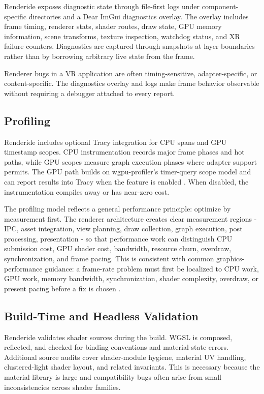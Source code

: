\documentclass[acmtog,screen,nonacm]{acmart}
\begin{document}
Renderide exposes diagnostic state through file-first logs under component-specific directories and a Dear ImGui diagnostics overlay. The overlay includes frame timing, renderer stats, shader routes, draw state, GPU memory information, scene transforms, texture inspection, watchdog status, and XR failure counters. Diagnostics are captured through snapshots at layer boundaries rather than by borrowing arbitrary live state from the frame.

Renderer bugs in a VR application are often timing-sensitive, adapter-specific, or content-specific. The diagnostics overlay and logs make frame behavior observable without requiring a debugger attached to every report.

\subsection{Profiling}

Renderide includes optional Tracy integration for CPU spans and GPU timestamp scopes. CPU instrumentation records major frame phases and hot paths, while GPU scopes measure graph execution phases where adapter support permits. The GPU path builds on wgpu-profiler's timer-query scope model and can report results into Tracy when the feature is enabled \citep{tracyProfiler,wgpuProfiler}. When disabled, the instrumentation compiles away or has near-zero cost.

The profiling model reflects a general performance principle: optimize by measurement first. The renderer architecture creates clear measurement regions - IPC, asset integration, view planning, draw collection, graph execution, post processing, presentation - so that performance work can distinguish CPU submission cost, GPU shader cost, bandwidth, resource churn, overdraw, synchronization, and frame pacing. This is consistent with common graphics-performance guidance: a frame-rate problem must first be localized to CPU work, GPU work, memory bandwidth, synchronization, shader complexity, overdraw, or present pacing before a fix is chosen \citep{unityGpuOptimization}.

\subsection{Build-Time and Headless Validation}

Renderide validates shader sources during the build. WGSL is composed, reflected, and checked for binding conventions and material-state errors. Additional source audits cover shader-module hygiene, material UV handling, clustered-light shader layout, and related invariants. This is necessary because the material library is large and compatibility bugs often arise from small inconsistencies across shader families.
\end{document}
